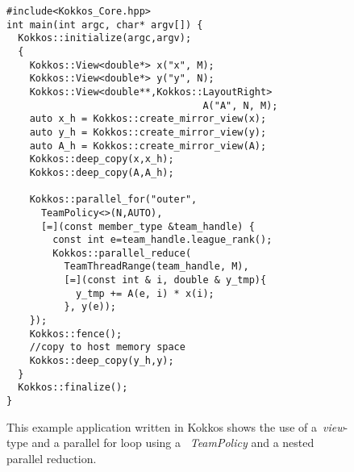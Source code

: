 \begin{figure}[t!]
\begin{small}
\begin{verbatim}
#include<Kokkos_Core.hpp>
int main(int argc, char* argv[]) {
  Kokkos::initialize(argc,argv);
  {
    Kokkos::View<double*> x("x", M);  
    Kokkos::View<double*> y("y", N);
    Kokkos::View<double**,Kokkos::LayoutRight> 
                                  A("A", N, M);  
    auto x_h = Kokkos::create_mirror_view(x);
    auto y_h = Kokkos::create_mirror_view(y);
    auto A_h = Kokkos::create_mirror_view(A);
    Kokkos::deep_copy(x,x_h);
    Kokkos::deep_copy(A,A_h);    
    
    Kokkos::parallel_for("outer", 
      TeamPolicy<>(N,AUTO),
      [=](const member_type &team_handle) {
        const int e=team_handle.league_rank();
        Kokkos::parallel_reduce( 
          TeamThreadRange(team_handle, M),
          [=](const int & i, double & y_tmp){
            y_tmp += A(e, i) * x(i);
          }, y(e));
    }); 
    Kokkos::fence();
    //copy to host memory space    
    Kokkos::deep_copy(y_h,y); 
  }
  Kokkos::finalize();
}
\end{verbatim}
\end{small}
\caption{This example application written in Kokkos shows the use of a~\emph{view}-type and a parallel for loop using a ~\emph{TeamPolicy} and a nested parallel reduction. }
\label{fig:KokkosExample}
\end{figure}

